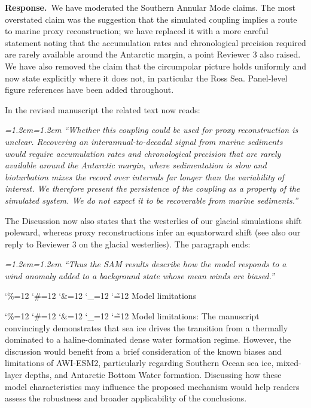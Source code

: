 \documentclass[11pt,a4paper]{article}
\newcommand{\comment}[1]{\par\medskip\noindent\color{black}\begingroup\catcode`\%=12 \catcode`\#=12 \catcode`\&=12 \catcode`\_=12 \catcode`\~=12 \commentbody}
\newcommand{\commentbody}[1]{#1\endgroup\par\smallskip}
\newcommand{\response}{\par\noindent\color{chgcol}\textbf{Response.}\ }
\newenvironment{change}{\par\smallskip\color{chgcol}\small\itshape\leftskip=1.2em\rightskip=1.2em\noindent\ignorespaces}{\par\smallskip}
\begin{document}
\response We have moderated the Southern Annular Mode claims. The most overstated claim was the suggestion that the simulated coupling implies a route to marine proxy reconstruction; we have replaced it with a more careful statement noting that the accumulation rates and chronological precision required are rarely available around the Antarctic margin, a point Reviewer 3 also raised. We have also removed the claim that the circumpolar picture holds uniformly and now state explicitly where it does not, in particular the Ross Sea. Panel-level figure references have been added throughout.

In the revised manuscript the related text now reads:

\begin{change}
``Whether this coupling could be used for proxy reconstruction is unclear. Recovering an interannual-to-decadal signal from marine sediments would require accumulation rates and chronological precision that are rarely available around the Antarctic margin, where sedimentation is slow and bioturbation mixes the record over intervals far longer than the variability of interest. We therefore present the persistence of the coupling as a property of the simulated system. We do not expect it to be recoverable from marine sediments.''
\end{change} 

The Discussion now also states that the westerlies of our glacial simulations shift poleward, whereas proxy reconstructions infer an equatorward shift (see also our reply to Reviewer 3 on the glacial westerlies). The paragraph ends:

\begin{change}
``Thus the SAM results describe how the model responds to a wind anomaly added to a background state whose mean winds are biased.''
\end{change}

\comment{R1}{Model limitations}

\comment{R1}{Model limitations: The manuscript convincingly demonstrates that sea ice drives the transition from a thermally dominated to a haline-dominated dense water formation regime. However, the discussion would benefit from a brief consideration of the known biases and limitations of AWI-ESM2, particularly regarding Southern Ocean sea ice, mixed-layer depths, and Antarctic Bottom Water formation. Discussing how these model characteristics may influence the proposed mechanism would help readers assess the robustness and broader applicability of the conclusions.}
\end{document}
